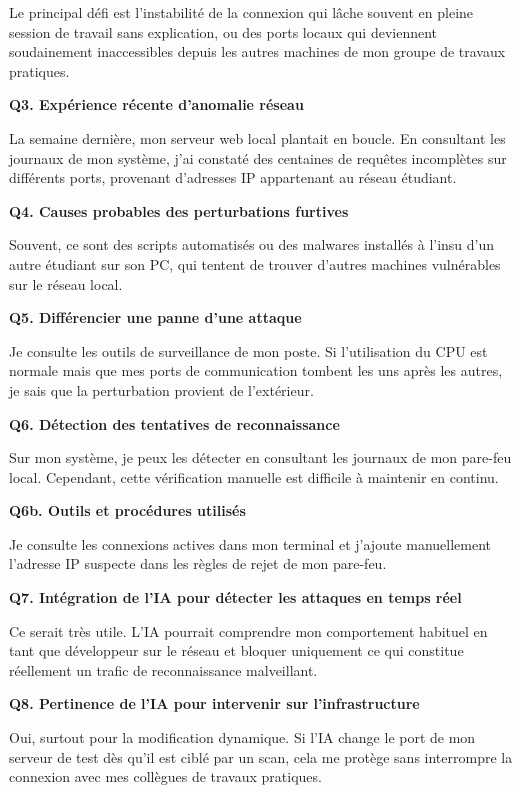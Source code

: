 \documentclass[12pt,a4paper]{article}
\begin{document}
Le principal d\'{e}fi est l'instabilit\'{e} de la connexion qui l\^{a}che souvent en pleine session de travail
sans explication, ou des ports locaux qui deviennent soudainement inaccessibles depuis les
autres machines de mon groupe de travaux pratiques.

\bigskip
\textbf{Q3. Exp\'{e}rience r\'{e}cente d'anomalie r\'{e}seau}

La semaine derni\`{e}re, mon serveur web local plantait en boucle. En consultant les journaux de
mon syst\`{e}me, j'ai constat\'{e} des centaines de requ\^{e}tes incompl\`{e}tes sur diff\'{e}rents ports,
provenant d'adresses IP appartenant au r\'{e}seau \'{e}tudiant.

\bigskip
\textbf{Q4. Causes probables des perturbations furtives}

Souvent, ce sont des scripts automatis\'{e}s ou des malwares install\'{e}s \`{a} l'insu d'un autre \'{e}tudiant
sur son PC, qui tentent de trouver d'autres machines vuln\'{e}rables sur le r\'{e}seau local.

\bigskip
\textbf{Q5. Diff\'{e}rencier une panne d'une attaque}

Je consulte les outils de surveillance de mon poste. Si l'utilisation du CPU est normale mais
que mes ports de communication tombent les uns apr\`{e}s les autres, je sais que la perturbation
provient de l'ext\'{e}rieur.

\bigskip
\textbf{Q6. D\'{e}tection des tentatives de reconnaissance}

Sur mon syst\`{e}me, je peux les d\'{e}tecter en consultant les journaux de mon pare-feu local.
Cependant, cette v\'{e}rification manuelle est difficile \`{a} maintenir en continu.

\bigskip
\textbf{Q6b. Outils et proc\'{e}dures utilis\'{e}s}

Je consulte les connexions actives dans mon terminal et j'ajoute manuellement l'adresse IP
suspecte dans les r\`{e}gles de rejet de mon pare-feu.

\bigskip
\textbf{Q7. Int\'{e}gration de l'IA pour d\'{e}tecter les attaques en temps r\'{e}el}

Ce serait tr\`{e}s utile. L'IA pourrait comprendre mon comportement habituel en tant que
d\'{e}veloppeur sur le r\'{e}seau et bloquer uniquement ce qui constitue r\'{e}ellement un trafic de
reconnaissance malveillant.

\bigskip
\textbf{Q8. Pertinence de l'IA pour intervenir sur l'infrastructure}

Oui, surtout pour la modification dynamique. Si l'IA change le port de mon serveur de test d\`{e}s
qu'il est cibl\'{e} par un scan, cela me prot\`{e}ge sans interrompre la connexion avec mes coll\`{e}gues
de travaux pratiques.
\end{document}
